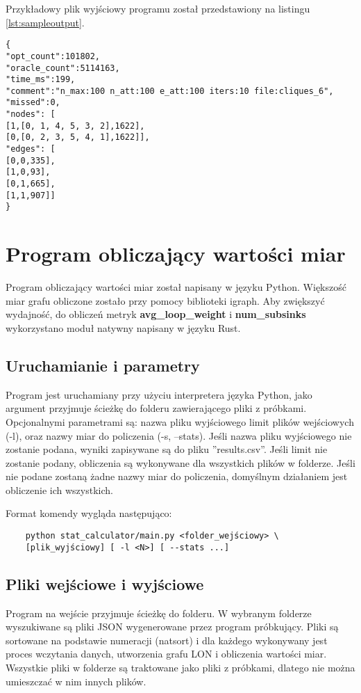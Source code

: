 Przykładowy plik wyjściowy programu został przedstawiony na listingu \ref{lst:sampleoutput}.

\begin{lstlisting}[caption={Przykład pliku wyjściowego po krótkim próbkowaniu małej instancji}, label=lst:sampleoutput]
{
"opt_count":101802,
"oracle_count":5114163,
"time_ms":199,
"comment":"n_max:100 n_att:100 e_att:100 iters:10 file:cliques_6",
"missed":0,
"nodes": [
[1,[0, 1, 4, 5, 3, 2],1622],
[0,[0, 2, 3, 5, 4, 1],1622]],
"edges": [
[0,0,335],
[1,0,93],
[0,1,665],
[1,1,907]]
}
\end{lstlisting}

\section{Program obliczający wartości miar}

Program obliczający wartości miar został napisany w języku Python.
Większość miar grafu obliczone zostało przy pomocy biblioteki igraph.
Aby zwiększyć wydajność, do obliczeń metryk \textbf{avg\_loop\_weight} i \textbf{num\_subsinks}
wykorzystano moduł natywny napisany w języku Rust.

\subsection{Uruchamianie i parametry}

Program jest uruchamiany przy użyciu interpretera języka Python, jako argument przyjmuje
ścieżkę do folderu zawierającego pliki z próbkami. Opcjonalnymi parametrami są: nazwa pliku wyjściowego
limit plików wejściowych (-l), oraz nazwy miar do policzenia (-s, --stats). Jeśli nazwa pliku wyjściowego nie zostanie podana, wyniki zapisywane
są do pliku ''results.csv''. Jeśli limit nie zostanie podany, obliczenia są wykonywane dla wszystkich plików w folderze.
Jeśli nie podane zostaną żadne nazwy miar do policzenia, domyślnym działaniem jest obliczenie ich wszystkich.

Format komendy wygląda następująco:
\begin{lstlisting}
    python stat_calculator/main.py <folder_wejściowy> \
    [plik_wyjściowy] [ -l <N>] [ --stats ...]
\end{lstlisting}

\subsection{Pliki wejściowe i wyjściowe}
Program na wejście przyjmuje ścieżkę do folderu. W wybranym folderze wyszukiwane są pliki JSON wygenerowane przez program próbkujący.
Pliki są sortowane na podstawie numeracji (natsort) i dla każdego wykonywany jest proces wczytania danych, utworzenia grafu LON i obliczenia
wartości miar. Wszystkie pliki w folderze są traktowane jako pliki z próbkami, dlatego nie można umieszczać w nim innych plików.


